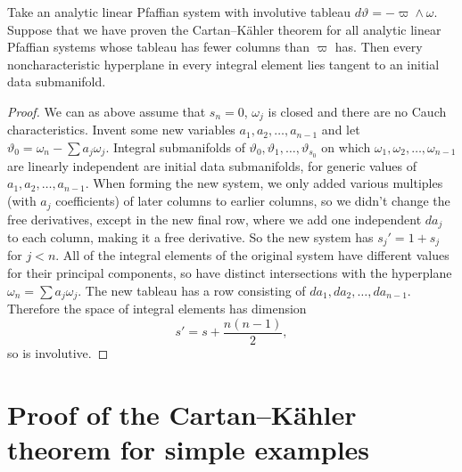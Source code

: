 \begin{lemma}
Take an analytic linear Pfaffian system with involutive tableau \(d \vartheta = - \varpi \wedge \omega\).
Suppose that we have proven the Cartan--K\"ahler theorem for all analytic linear Pfaffian systems whose tableau has fewer columns than \(\varpi\) has.
Then every noncharacteristic hyperplane in every integral element lies tangent to an initial data submanifold.
\end{lemma}
\begin{proof}
We can as above assume that \(s_n=0\), \(\omega_j\) is closed and there are no Cauch characteristics.
Invent some new variables \(a_1, a_2, \dots, a_{n-1}\) and let \(\vartheta_0=\omega_n-\sum a_j \omega_j\).
Integral submanifolds of \(\vartheta_0, \vartheta_1, \dots, \vartheta_{s_0}\) on which \(\omega_1, \omega_2, \dots, \omega_{n-1}\) are linearly independent are initial data submanifolds, for generic values of \(a_1, a_2, \dots, a_{n-1}\).
When forming the new system, we only added various multiples (with \(a_j\) coefficients) of later columns to earlier columns, so we didn't change the free derivatives, except in the new final row, where we add one independent \(da_j\) to each column, making it a free derivative.
So the new system has \(s_j'=1+s_j\) for \(j<n\).
All of the integral elements of the original system have different values for their principal components, so have distinct intersections with the hyperplane \(\omega_n=\sum a_j \omega_j\).
The new tableau has a row consisting of \(da_1, da_2,\dots,da_{n-1}\).
Therefore the space of integral elements has dimension 
\[
s'=s+\frac{n(n-1)}{2},
\]
so is involutive.
\end{proof}



\section{\texorpdfstring{Proof of the Cartan--K\"ahler theorem for simple examples}{Proof of the Cartan Kaehler theorem for simple examples}}

